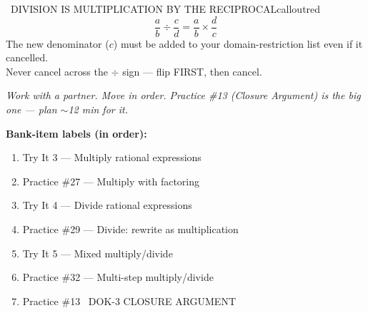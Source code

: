 \documentclass[11pt]{article}
\begin{document}
\begin{callout}{\IconWarn\ DIVISION IS MULTIPLICATION BY THE RECIPROCAL}{calloutred}
\[
\frac{a}{b}\div \frac{c}{d} = \frac{a}{b}\times \frac{d}{c}
\]
The new denominator (\(c\)) must be added to your domain-restriction list even if it cancelled.\\
Never cancel across the \(\div\) sign --- flip FIRST, then cancel.
\end{callout}

\textit{Work with a partner. Move in order. Practice \#13 (Closure Argument) is the big one --- plan \(\sim\)12 min for it.}

\textbf{Bank-item labels (in order):}
\begin{enumerate}[leftmargin=1.6em,itemsep=2pt,topsep=2pt]
  \item Try It 3 --- Multiply rational expressions
  \item Practice \#27 --- Multiply with factoring
  \item Try It 4 --- Divide rational expressions
  \item Practice \#29 --- Divide: rewrite as multiplication
  \item Try It 5 --- Mixed multiply/divide
  \item Practice \#32 --- Multi-step multiply/divide
  \item Practice \#13  \IconStar\ DOK-3 CLOSURE ARGUMENT
\end{enumerate}



\end{document}
